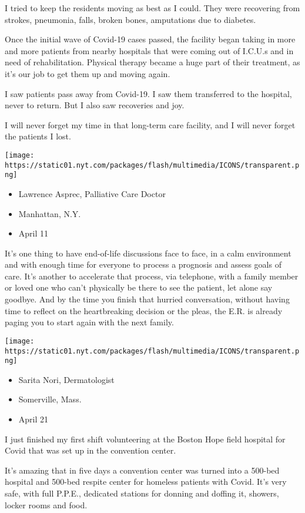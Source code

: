 I tried to keep the residents moving as best as I could. They were
recovering from strokes, pneumonia, falls, broken bones, amputations due
to diabetes.

Once the initial wave of Covid-19 cases passed, the facility began
taking in more and more patients from nearby hospitals that were coming
out of I.C.U.s and in need of rehabilitation. Physical therapy became a
huge part of their treatment, as it's our job to get them up and moving
again.

I saw patients pass away from Covid-19. I saw them transferred to the
hospital, never to return. But I also saw recoveries and joy.

I will never forget my time in that long-term care facility, and I will
never forget the patients I lost.

\texttt{[image: https://static01.nyt.com/packages/flash/multimedia/ICONS/transparent.png]}

\begin{itemize}
\tightlist
\item
  Lawrence Asprec, Palliative Care Doctor
\item
  Manhattan, N.Y.
\item
  April 11
\end{itemize}

It's one thing to have end-of-life discussions face to face, in a calm
environment and with enough time for everyone to process a prognosis and
assess goals of care. It's another to accelerate that process, via
telephone, with a family member or loved one who can't physically be
there to see the patient, let alone say goodbye. And by the time you
finish that hurried conversation, without having time to reflect on the
heartbreaking decision or the pleas, the E.R. is already paging you to
start again with the next family.

\texttt{[image: https://static01.nyt.com/packages/flash/multimedia/ICONS/transparent.png]}

\begin{itemize}
\tightlist
\item
  Sarita Nori, Dermatologist
\item
  Somerville, Mass.
\item
  April 21
\end{itemize}

I just finished my first shift volunteering at the Boston Hope field
hospital for Covid that was set up in the convention center.

It's amazing that in five days a convention center was turned into a
500-bed hospital and 500-bed respite center for homeless patients with
Covid. It's very safe, with full P.P.E., dedicated stations for donning
and doffing it, showers, locker rooms and food.

